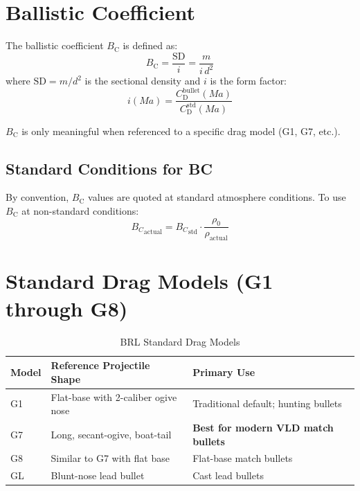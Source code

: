 \documentclass[11pt,twoside,openright]{report}
\newcommand{\Cd}{C_{\mathrm{D}}}
\newcommand{\Bc}{B_{\mathrm{C}}}
\newcommand{\Mach}{\mathit{Ma}}
\newcommand{\sd}{\mathrm{SD}}
\begin{document}
\section{Ballistic Coefficient}
\label{sec:bc}

The ballistic coefficient $\Bc$ is defined as:
\begin{equation}
  \boxed{\Bc = \frac{\sd}{i} = \frac{m}{i\,d^2}}
  \label{eq:bc_definition}
\end{equation}
where $\sd = m/d^2$ is the sectional density and $i$ is the form factor:
\begin{equation}
  i(\Mach) = \frac{\Cd^{\mathrm{bullet}}(\Mach)}{\Cd^{\mathrm{std}}(\Mach)}
  \label{eq:form_factor}
\end{equation}

$\Bc$ is only meaningful when referenced to a specific drag model (G1, G7, etc.).

\subsection{Standard Conditions for BC}

By convention, $\Bc$ values are quoted at standard atmosphere conditions. To use $\Bc$ at non-standard conditions:
\begin{equation}
  {B_C}_{\mathrm{actual}} = {B_C}_{\mathrm{std}} \cdot \frac{\rho_0}{\rho_{\mathrm{actual}}}
  \label{eq:bc_density_correction}
\end{equation}

\section{Standard Drag Models (G1 through G8)}
\label{sec:drag_models}

\begin{table}[H]
\centering
\caption{BRL Standard Drag Models \citep{mccoy1999modern, ingalls1893exterior}}
\label{tab:drag_models}
\begin{tabularx}{\textwidth}{@{}lXl@{}}
\toprule
\textbf{Model} & \textbf{Reference Projectile Shape} & \textbf{Primary Use} \\
\midrule
G1 & Flat-base with 2-caliber ogive nose & Traditional default; hunting bullets \\
G7 & Long, secant-ogive, boat-tail & \textbf{Best for modern VLD match bullets} \\
G8 & Similar to G7 with flat base & Flat-base match bullets \\
GL & Blunt-nose lead bullet & Cast lead bullets \\
\bottomrule
\end{tabularx}
\end{table}
\end{document}
